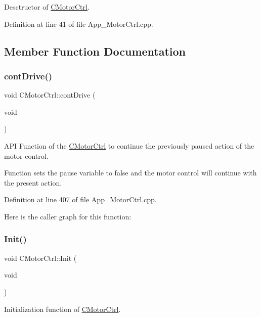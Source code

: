 Desctructor of \mbox{\hyperlink{class_c_motor_ctrl}{C\+Motor\+Ctrl}}. 



Definition at line 41 of file App\+\_\+\+Motor\+Ctrl.\+cpp.



\subsection{Member Function Documentation}
\mbox{\label{class_c_motor_ctrl_a6b67180c355c2acf76d641f2817db66d}} 
\subsubsection{\texorpdfstring{contDrive()}{contDrive()}}
{\footnotesize\ttfamily void C\+Motor\+Ctrl\+::cont\+Drive (\begin{DoxyParamCaption}\item[{void}]{ }\end{DoxyParamCaption})}



A\+PI Function of the \mbox{\hyperlink{class_c_motor_ctrl}{C\+Motor\+Ctrl}} to continue the previously paused action of the motor control. 

Function sets the pause variable to false and the motor control will continue with the present action. 

Definition at line 407 of file App\+\_\+\+Motor\+Ctrl.\+cpp.

Here is the caller graph for this function\+:
\mbox{\label{class_c_motor_ctrl_af4b1bec8e07e766aa2537d966f025e7a}} 
\subsubsection{\texorpdfstring{Init()}{Init()}}
{\footnotesize\ttfamily void C\+Motor\+Ctrl\+::\+Init (\begin{DoxyParamCaption}\item[{void}]{ }\end{DoxyParamCaption})}



Initialization function of \mbox{\hyperlink{class_c_motor_ctrl}{C\+Motor\+Ctrl}}. 

